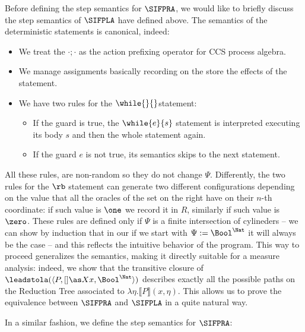 Before defining the step semantics for $\SIFPRA$,
we would like to briefly discuss the
step semantics of $\SIFPLA$ have defined above.
The semantics of the deterministic statements
is canonical, indeed:
\begin{itemize}
  \item We treat the $\cdot;\cdot$ as the action prefixing operator for
  CCS process algebra.
  \item We manage assignments basically recording on the store the effects of the statement.
  \item We have two rules for the $\while{}{}$statement:
  \begin{itemize}
    \item If the guard is true, the $\while{e}{s}$ statement
    is interpreted executing its body $s$ and then the
    whole statement again.
    \item If the guard $e$ is not true,
    its semantics skips to the next statement.
  \end{itemize}
\end{itemize}
%
All these rules, are non-random so they do not change $\Psi$. Differently, the
two rules for the $\rb$ statement can generate two different configurations depending
on the value that all the oracles of the set on the right have on their $n$-th
coordinate: if such value is $\one$ we record it in $R$,
similarly if such value is $\zero$. These rules are defined only if $\Psi$ is a
finite intersection of cylineders -- we can show by induction that
in our if we start with $\Psi:= \Bool^\Nat$ it will always be the case -- and
this reflects the intuitive behavior of the program.
%
This way to proceed generalizes the semantics, making it directly suitable for
a measure analysis: indeed, we show that the transitive closure of
$\leadstola (\langle P, []\as X x, \Bool^\Nat\rangle)$
describes exactly all the possible paths on the Reduction Tree associated to
$\lambda \eta. \llbracket P\rrbracket(x, \eta)$. This allows us to prove the equivalence between
$\SIFPRA$ and $\SIFPLA$ in a quite natural way.

In a similar fashion, we define the step semantics for $\SIFPRA$:

